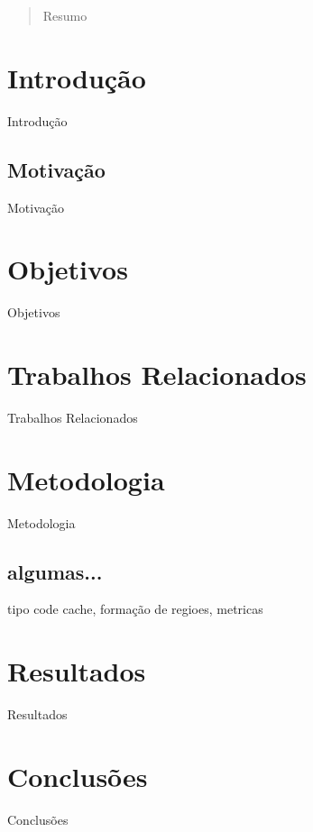 \documentclass[11pt,twoside]{article}
\begin{document}
\begin{abstract} 
  Resumo %
  
\end{abstract}

\section{Introdução}
Introdução

\subsection{Motivação}
Motivação

\section{Objetivos}
Objetivos

\section{Trabalhos Relacionados}
Trabalhos Relacionados

\section{Metodologia}
Metodologia\cite{thesis-zinsly}

\subsection{algumas...}
tipo code cache, formação de regioes, metricas

\section{Resultados}
Resultados

\section{Conclusões}
Conclusões




\end{document}
